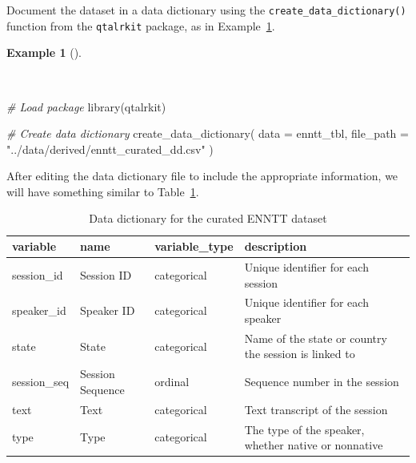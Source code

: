 \documentclass[
  letterpaper,
  DIV=11,
  numbers=noendperiod]{scrreport}
\newenvironment{Shaded}{\begin{snugshade}}{\end{snugshade}}
\newcommand{\AttributeTok}[1]{\textcolor[rgb]{0.00,0.00,0.00}{#1}}
\newcommand{\CommentTok}[1]{\textcolor[rgb]{0.00,0.00,0.00}{\textit{#1}}}
\newcommand{\FunctionTok}[1]{\textcolor[rgb]{0.00,0.00,0.00}{#1}}
\newcommand{\NormalTok}[1]{\textcolor[rgb]{0.00,0.00,0.00}{#1}}
\newcommand{\StringTok}[1]{\textcolor[rgb]{0.00,0.00,0.00}{#1}}
\theoremstyle{definition}
\newtheorem{example}{Example}[chapter]
\theoremstyle{remark}
\begin{document}
Document the dataset in a data dictionary using the
\texttt{create\_data\_dictionary()} function from the \texttt{qtalrkit}
package, as in Example~\ref{exm-cd-enntt-create-data-dictionary}.

\begin{example}[]\protect\hypertarget{exm-cd-enntt-create-data-dictionary}{}\label{exm-cd-enntt-create-data-dictionary}

~

\begin{Shaded}
\begin{Highlighting}[]
\CommentTok{\# Load package}
\FunctionTok{library}\NormalTok{(qtalrkit)}

\CommentTok{\# Create data dictionary}
\FunctionTok{create\_data\_dictionary}\NormalTok{(}
  \AttributeTok{data =}\NormalTok{ enntt\_tbl,}
  \AttributeTok{file\_path =} \StringTok{"../data/derived/enntt\_curated\_dd.csv"}
\NormalTok{)}
\end{Highlighting}
\end{Shaded}

\end{example}

After editing the data dictionary file to include the appropriate
information, we will have something similar to
Table~\ref{tbl-cd-enntt-data-dictionary}.

\hypertarget{tbl-cd-enntt-data-dictionary}{}
\begin{table}
\caption{\label{tbl-cd-enntt-data-dictionary}Data dictionary for the curated ENNTT dataset }\tabularnewline

\centering
\begin{tabular}{l|l|l|l}
\hline
variable & name & variable\_type & description\\
\hline
session\_id & Session ID & categorical & Unique identifier for each session\\
\hline
speaker\_id & Speaker ID & categorical & Unique identifier for each speaker\\
\hline
state & State & categorical & Name of the state or country the session is linked to\\
\hline
session\_seq & Session Sequence & ordinal & Sequence number in the session\\
\hline
text & Text & categorical & Text transcript of the session\\
\hline
type & Type & categorical & The type of the speaker, whether native or nonnative\\
\hline
\end{tabular}
\end{table}
\end{document}
